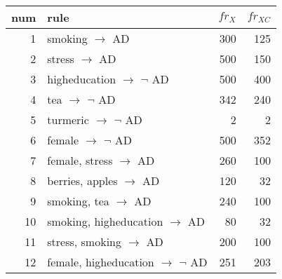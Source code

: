 \begin{tabular}{|r|l|r|r|}
\hline 
num&rule&$\mathit{fr_X}$&$\mathit{fr_{XC}}${\rule{0pt}{2.2ex}}\\
\hline
1&smoking $\rightarrow$ AD&300&125{\rule{0pt}{2.6ex}}\\
2&stress $\rightarrow$ AD&500&150\\
3&higheducation $\rightarrow$ $\neg$ AD&500&400\\
4&tea $\rightarrow$ $\neg$ AD&342&240\\
5&turmeric $\rightarrow$ $\neg$ AD&2&2\\
6&female $\rightarrow$ $\neg$ AD&500&352\\
7&female, stress $\rightarrow$ AD&260&100\\
8&berries, apples $\rightarrow$ AD&120&32\\
9&smoking, tea $\rightarrow$ AD&240&100\\
10&smoking, higheducation $\rightarrow$ AD&80&32\\
11&stress, smoking $\rightarrow$ AD&200&100\\
12&female, higheducation $\rightarrow$ $\neg$ AD&251&203{\rule[-1.2ex]{0pt}{0pt}}\\
\hline
\end{tabular}
